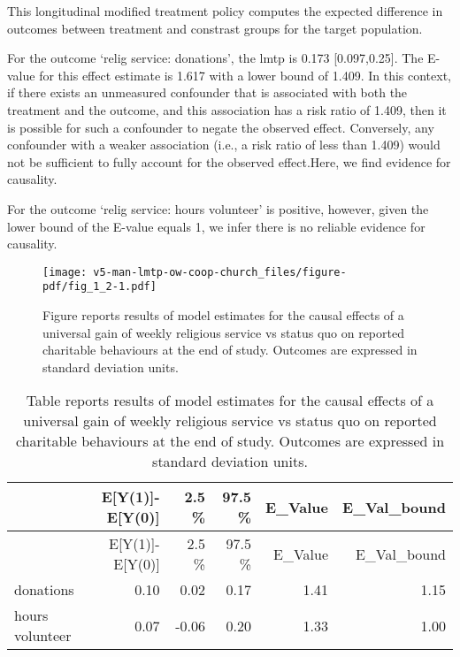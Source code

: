 \documentclass[
  singlecolumn]{article}
\begin{document}
This longitudinal modified treatment policy computes the expected
difference in outcomes between treatment and constrast groups for the
target population.

For the outcome `relig service: donations', the lmtp is 0.173
{[}0.097,0.25{]}. The E-value for this effect estimate is 1.617 with a
lower bound of 1.409. In this context, if there exists an unmeasured
confounder that is associated with both the treatment and the outcome,
and this association has a risk ratio of 1.409, then it is possible for
such a confounder to negate the observed effect. Conversely, any
confounder with a weaker association (i.e., a risk ratio of less than
1.409) would not be sufficient to fully account for the observed
effect.Here, we find evidence for causality.

For the outcome `relig service: hours volunteer' is positive, however,
given the lower bound of the E-value equals 1, we infer there is no
reliable evidence for causality.

\newpage{}

\begin{figure}[H]

{\centering \texttt{[image: v5-man-lmtp-ow-coop-church\_files/figure-pdf/fig\_1\_2-1.pdf]}

}

\caption{Figure reports results of model estimates for the causal
effects of a universal gain of weekly religious service vs status quo on
reported charitable behaviours at the end of study. Outcomes are
expressed in standard deviation units.}

\end{figure}%

\label{tbl_1_2}
\begin{longtable}[]{@{}lrrrrr@{}}
\caption{Table reports results of model estimates for the causal effects
of a universal gain of weekly religious service vs status quo on
reported charitable behaviours at the end of study. Outcomes are
expressed in standard deviation units.}\tabularnewline
\toprule\noalign{}
& E{[}Y(1){]}-E{[}Y(0){]} & 2.5 \% & 97.5 \% & E\_Value &
E\_Val\_bound \\
\midrule\noalign{}
\endfirsthead
\toprule\noalign{}
& E{[}Y(1){]}-E{[}Y(0){]} & 2.5 \% & 97.5 \% & E\_Value &
E\_Val\_bound \\
\midrule\noalign{}
\endhead
\bottomrule\noalign{}
\endlastfoot
donations & 0.10 & 0.02 & 0.17 & 1.41 & 1.15 \\
hours volunteer & 0.07 & -0.06 & 0.20 & 1.33 & 1.00 \\
\end{longtable}
\end{document}
